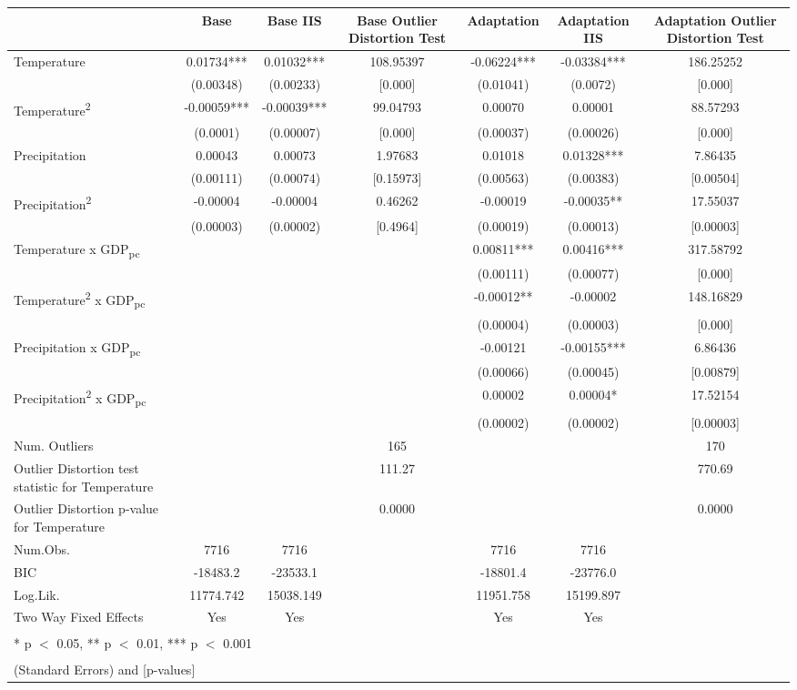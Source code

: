 \begin{table}
\centering
\begin{tabular}[t]{lcccccc}
\toprule
  & Base & Base IIS & Base Outlier Distortion Test & Adaptation & Adaptation IIS & Adaptation Outlier Distortion Test\\
\midrule
Temperature & 0.01734*** & 0.01032*** & 108.95397 & -0.06224*** & -0.03384*** & 186.25252\\
 & (0.00348) & (0.00233) & [0.000] & (0.01041) & (0.0072) & [0.000]\\
Temperature\textsuperscript{2} & -0.00059*** & -0.00039*** & 99.04793 & 0.00070 & 0.00001 & 88.57293\\
 & (0.0001) & (0.00007) & [0.000] & (0.00037) & (0.00026) & [0.000]\\
Precipitation & 0.00043 & 0.00073 & 1.97683 & 0.01018 & 0.01328*** & 7.86435\\
 & (0.00111) & (0.00074) & [0.15973] & (0.00563) & (0.00383) & [0.00504]\\
Precipitation\textsuperscript{2} & -0.00004 & -0.00004 & 0.46262 & -0.00019 & -0.00035** & 17.55037\\
 & (0.00003) & (0.00002) & [0.4964] & (0.00019) & (0.00013) & [0.00003]\\
Temperature x GDP\textsubscript{pc} &  &  &  & 0.00811*** & 0.00416*** & 317.58792\\
 &  &  &  & (0.00111) & (0.00077) & [0.000]\\
Temperature\textsuperscript{2} x GDP\textsubscript{pc} &  &  &  & -0.00012** & -0.00002 & 148.16829\\
 &  &  &  & (0.00004) & (0.00003) & [0.000]\\
Precipitation x GDP\textsubscript{pc} &  &  &  & -0.00121 & -0.00155*** & 6.86436\\
 &  &  &  & (0.00066) & (0.00045) & [0.00879]\\
Precipitation\textsuperscript{2} x GDP\textsubscript{pc} &  &  &  & 0.00002 & 0.00004* & 17.52154\\
 &  &  &  & (0.00002) & (0.00002) & [0.00003]\\
\midrule
Num. Outliers &  &  & 165 &  &  & 170\\
Outlier Distortion test statistic for Temperature &  &  & 111.27 &  &  & 770.69\\
Outlier Distortion p-value for Temperature &  &  & 0.0000 &  &  & 0.0000\\
Num.Obs. & 7716 & 7716 &  & 7716 & 7716 & \\
BIC & -18483.2 & -23533.1 &  & -18801.4 & -23776.0 & \\
Log.Lik. & 11774.742 & 15038.149 &  & 11951.758 & 15199.897 & \\
Two Way Fixed Effects & Yes & Yes &  & Yes & Yes & \\
\bottomrule
\multicolumn{7}{l}{\textsuperscript{} * p $<$ 0.05, ** p $<$ 0.01, *** p $<$ 0.001}\\
\multicolumn{7}{l}{\textsuperscript{} (Standard Errors) and [p-values]}\\
\end{tabular}
\end{table}
